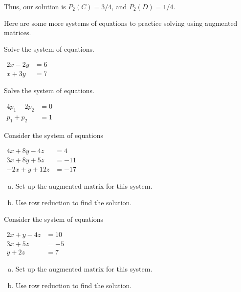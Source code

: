 Thus, our solution is $P_2(C)=3/4$, and $P_2(D)=1/4$.

Here are some more systems of equations to practice solving using augmented matrices.

\begin{xca}
Solve the system of equations.

$\begin{matrix}
2x-2y&=6\\x+3y&=7
\end{matrix}$

\end{xca}


\begin{xca}
Solve the system of equations.

$\begin{matrix}
4p_1-2p_2&=0\\p_1+p_2&=1
\end{matrix}$
\end{xca}

\begin{xca} 
Consider the system of equations 

$\begin{matrix}
4x+8y-4z&=4\\3x+8y+5z&=-11\\-2x+y+12z&=-17
\end{matrix}$
\begin{enumerate}[(a)]
\item Set up the augmented matrix for this system.
\item Use row reduction to find the solution.

\end{enumerate}
\end{xca}

\begin{xca}
Consider the system of equations 

$\begin{matrix}
2x+y-4z&=10\\3x+5z&=-5\\y+2z&=7
\end{matrix}$
\begin{enumerate}[(a)]
\item Set up the augmented matrix for this system.
\item Use row reduction to find the solution.
 
\end{enumerate}
\end{xca}


